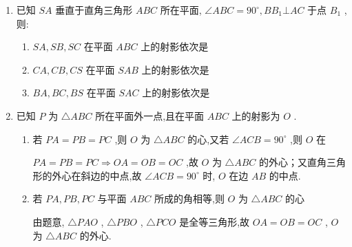 \begin{enumerate}
\begin{enumerate}
          \begin{jieda}
              设点 $P$ 到 $\alpha$ 的距离 ${PO} = h {{cm}}$ ,并设 ${OA} = {4k}{{cm}},{OB} = \sqrt{3}k {{cm}}\left( {h,k > 0}\right)$ . 在Rt $\bigtriangleup  {POA}$ 和 Rt $\bigtriangleup  {POB}$ 中,由勾股定理得 $\left\{  \begin{array}{l} {h}^{2} + {16}{k}^{2} = {64}, \\  {h}^{2} + 3{k}^{2} = {25}. \end{array}\right.$ 解得 $\left\{  \begin{array}{l} h = 4 \\  k = \sqrt{3} \end{array}\right.$ .
          \end{jieda}
      \end{enumerate}
      \item 已知 ${SA}$ 垂直于直角三角形 ${ABC}$ 所在平面, $\angle {ABC} = {90}^{ \circ  },B{B}_{1}\bot {AC}$ 于点 ${B}_{1}$ ,则:
      \begin{enumerate}
          \item ${SA},{SB},{SC}$ 在平面 ${ABC}$ 上的射影依次是
          \item ${CA},{CB},{CS}$ 在平面 ${SAB}$ 上的射影依次是
          \item ${BA},{BC},{BS}$ 在平面 ${SAC}$ 上的射影依次是
      \end{enumerate}
      \item 已知 $P$ 为 $\bigtriangleup {ABC}$ 所在平面外一点,且在平面 ${ABC}$ 上的射影为 $O$ .
      \begin{enumerate}
          \item 若 ${PA} = {PB} = {PC}$ ,则 $O$ 为 $\bigtriangleup  {ABC}$ 的心,又若 $\angle {ACB} = {90}^{ \circ  }$ ,则 $O$ 在
          \begin{jieda}
              ${PA} = {PB} = {PC} \Longrightarrow  {OA} = {OB} = {OC}$ ,故 $O$ 为 $\bigtriangleup  {ABC}$ 的外心；又直角三角形的外心在斜边的中点,故 $\angle {ACB} = {90}^{ \circ  }$ 时, $O$ 在边 ${AB}$ 的中点.
          \end{jieda}
          \item 若 ${PA},{PB},{PC}$ 与平面 ${ABC}$ 所成的角相等,则 $O$ 为 $\bigtriangleup  {ABC}$ 的心
          \begin{jieda}
              由题意, $\bigtriangleup {PAO}$ , $\bigtriangleup {PBO}$ , $\bigtriangleup {PCO}$ 是全等三角形,故 ${OA} = {OB} = {OC}$ , $O$ 为 $\bigtriangleup {ABC}$ 的外心.

\end{jieda}
\end{enumerate}
\end{enumerate}
